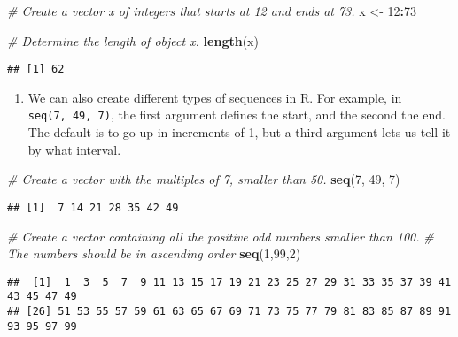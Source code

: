 \documentclass[
]{article}
\newenvironment{Shaded}{\begin{snugshade}}{\end{snugshade}}
\newcommand{\CommentTok}[1]{\textcolor[rgb]{0.56,0.35,0.01}{\textit{#1}}}
\newcommand{\DecValTok}[1]{\textcolor[rgb]{0.00,0.00,0.81}{#1}}
\newcommand{\KeywordTok}[1]{\textcolor[rgb]{0.13,0.29,0.53}{\textbf{#1}}}
\newcommand{\NormalTok}[1]{#1}
\newcommand{\OperatorTok}[1]{\textcolor[rgb]{0.81,0.36,0.00}{\textbf{#1}}}
\newcommand{\StringTok}[1]{\textcolor[rgb]{0.31,0.60,0.02}{#1}}
\providecommand{\tightlist}{%
  \setlength{\itemsep}{0pt}\setlength{\parskip}{0pt}}
\begin{document}
\begin{Shaded}
\begin{Highlighting}[]
\CommentTok{# Create a vector x of integers that starts at 12 and ends at 73.}
\NormalTok{x <-}\StringTok{ }\DecValTok{12}\OperatorTok{:}\DecValTok{73}

\CommentTok{# Determine the length of object x.}
\KeywordTok{length}\NormalTok{(x)}
\end{Highlighting}
\end{Shaded}

\begin{verbatim}
## [1] 62
\end{verbatim}

\begin{enumerate}
\def\labelenumi{\arabic{enumi}.}
\setcounter{enumi}{6}
\tightlist
\item
  We can also create different types of sequences in R. For example, in
  \texttt{seq(7,\ 49,\ 7)}, the first argument defines the start, and
  the second the end. The default is to go up in increments of 1, but a
  third argument lets us tell it by what interval.
\end{enumerate}

\begin{Shaded}
\begin{Highlighting}[]
\CommentTok{# Create a vector with the multiples of 7, smaller than 50.}
\KeywordTok{seq}\NormalTok{(}\DecValTok{7}\NormalTok{, }\DecValTok{49}\NormalTok{, }\DecValTok{7}\NormalTok{) }
\end{Highlighting}
\end{Shaded}

\begin{verbatim}
## [1]  7 14 21 28 35 42 49
\end{verbatim}

\begin{Shaded}
\begin{Highlighting}[]
\CommentTok{# Create a vector containing all the positive odd numbers smaller than 100.}
\CommentTok{# The numbers should be in ascending order}
\KeywordTok{seq}\NormalTok{(}\DecValTok{1}\NormalTok{,}\DecValTok{99}\NormalTok{,}\DecValTok{2}\NormalTok{)}
\end{Highlighting}
\end{Shaded}

\begin{verbatim}
##  [1]  1  3  5  7  9 11 13 15 17 19 21 23 25 27 29 31 33 35 37 39 41 43 45 47 49
## [26] 51 53 55 57 59 61 63 65 67 69 71 73 75 77 79 81 83 85 87 89 91 93 95 97 99
\end{verbatim}
\end{document}
